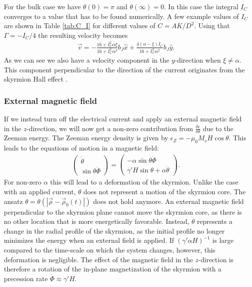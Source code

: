 \documentclass[12pt, a4paper, twoside, openright]{article}		%
\numberwithin{equation}{section}
\begin{document}
For the bulk case we have $\theta(0) = \pi$ and $\theta(\infty) = 0$. In this case the integral $I_C$ converges to a value that has to be found numerically. A few example values of $I_C$ are shown in Table \ref{tab:C_I} for different values of $C = AK/D^2$. Using that $\Gamma = -I_C/4$ the resulting velocity becomes
\begin{align}
\vec{v} = -\frac{16+I_C^2\alpha\xi}{16+I_C^2\alpha^2}b_J\hat{x} + \frac{4(\alpha-\xi)I_C}{16+I_C^2\alpha^2}b_J\hat{y}.
\end{align}
As we can see we also have a velocity component in the $y$-direction when $\xi\neq\alpha$. This component perpendicular to the direction of the current originates from the skyrmion Hall effect \cite{Nagaosa2013}.

\subsubsection{External magnetic field}
If we instead turn off the electrical current and apply an external magnetic field in the $z$-direction, we will now get a non-zero contribution from $\frac{\delta\epsilon}{\delta\theta}$ due to the Zeeman energy. The Zeeman energy density is given by $\epsilon_Z = -\mu_0M_sH\cos\theta$. This leads to the equations of motion in a magnetic field:
\begin{align}
\nonumber \begin{pmatrix}
\dot{\theta} \\ \sin\theta\dot{\Phi}
\end{pmatrix} =
\begin{pmatrix}
-\alpha \sin\theta\dot{\Phi} \\ \gamma' H\sin\theta + \alpha\dot{\theta}
\end{pmatrix}.
\label{eq:LLG_skyrmion_Hz}
\end{align}
For non-zero $\alpha$ this will lead to a deformation of the skyrmion. Unlike the case with an applied current, $\dot{\theta}$ does not represent a motion of the skyrmion core. The ansatz $\theta = \theta(|\vec{\rho}-\vec{\rho}_0(t)|)$ does not hold anymore. An external magnetic field perpendicular to the skyrmion plane cannot move the skyrmion core, as there is no other location that is more energetically favorable. Instead, $\dot{\theta}$ represents a change in the radial profile of the skyrmion, as the initial profile no longer minimizes the energy when an external field is applied. If $(\gamma'\alpha H)^{-1}$ is large compared to the time-scale on which the system changes, however, this deformation is negligible. The effect of the magnetic field in the $z$-direction is therefore a rotation of the in-plane magnetization of the skyrmion with a precession rate $\dot{\Phi} \approx \gamma'H$.
\end{document}
